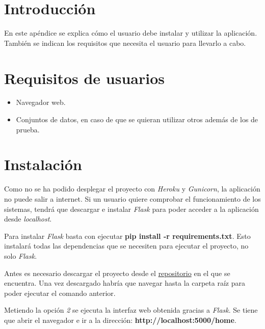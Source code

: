 
\section{Introducción}
En este apéndice se explica cómo el usuario debe instalar y utilizar la aplicación. También se indican los requisitos que necesita el usuario para llevarlo a cabo.

\section{Requisitos de usuarios}
\begin{itemize}
\tightlist
\item Navegador web.
\item Conjuntos de datos, en caso de que se quieran utilizar otros además de los de prueba.
\end{itemize}

\section{Instalación}
Como no se ha podido desplegar el proyecto con \textit{Heroku} y \textit{Gunicorn}, la aplicación no puede salir a internet. Si un usuario quiere comprobar el funcionamiento de los sistemas, tendrá que descargar e instalar \textit{Flask} para poder acceder a la aplicación desde \textit{localhost}.

Para instalar \textit{Flask} basta con ejecutar \textbf{pip install -r requirements.txt}. Esto instalará todas las dependencias que se necesiten para ejecutar el proyecto, no solo \textit{Flask}. 

Antes es necesario descargar el proyecto desde el \href{https://github.com/rnc0011/SistemaRecomendacionTFG}{repositorio} en el que se encuentra. Una vez descargado habría que navegar hasta la carpeta raíz para poder ejecutar el comando anterior.




Metiendo la opción \textit{2} se ejecuta la interfaz web obtenida gracias a \textit{Flask}. Se tiene que abrir el navegador e ir a la dirección: \textbf{http://localhost:5000/home}.


